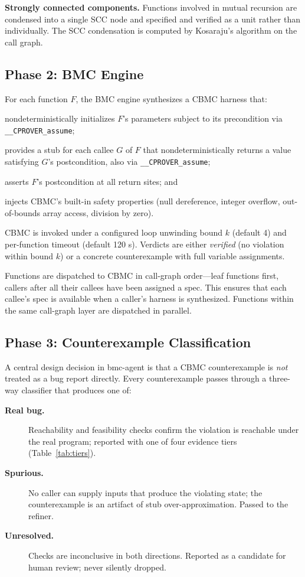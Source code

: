 \documentclass[11pt,a4paper]{article}
\newcommand{\tool}{bmc-agent\xspace}
\begin{document}
\smallskip\noindent\textbf{Strongly connected components.}
Functions involved in mutual recursion are condensed into a single SCC node
and specified and verified as a unit rather than individually. The SCC
condensation is computed by Kosaraju's algorithm on the call graph.

\subsection{Phase 2: BMC Engine}
\label{sec:bmc}

For each function $F$, the BMC engine synthesizes a CBMC harness that:
\begin{enumerate*}[label=(\roman*)]
  \item nondeterministically initializes $F$'s parameters subject to its
    precondition via \lstinline{__CPROVER_assume};
  \item provides a stub for each callee $G$ of $F$ that nondeterministically
    returns a value satisfying $G$'s postcondition, also via
    \lstinline{__CPROVER_assume};
  \item asserts $F$'s postcondition at all return sites; and
  \item injects CBMC's built-in safety properties (null dereference, integer
    overflow, out-of-bounds array access, division by zero).
\end{enumerate*}
CBMC is invoked under a configured loop unwinding bound $k$ (default 4) and
per-function timeout (default 120 s). Verdicts are either \emph{verified}
(no violation within bound $k$) or a concrete counterexample with full
variable assignments.

Functions are dispatched to CBMC in call-graph order---leaf functions first,
callers after all their callees have been assigned a spec. This ensures that
each callee's spec is available when a caller's harness is synthesized.
Functions within the same call-graph layer are dispatched in parallel.

\subsection{Phase 3: Counterexample Classification}
\label{sec:classifier}

A central design decision in \tool is that a CBMC counterexample is
\emph{not} treated as a bug report directly. Every counterexample passes
through a three-way classifier that produces one of:

\begin{description}
\item[\textbf{Real bug.}] Reachability and feasibility checks confirm the
  violation is reachable under the real program; reported with one of four
  evidence tiers (Table~\ref{tab:tiers}).
\item[\textbf{Spurious.}] No caller can supply inputs that produce the
  violating state; the counterexample is an artifact of stub
  over-approximation. Passed to the refiner.
\item[\textbf{Unresolved.}] Checks are inconclusive in both directions.
  Reported as a candidate for human review; never silently dropped.
\end{description}
\end{document}
